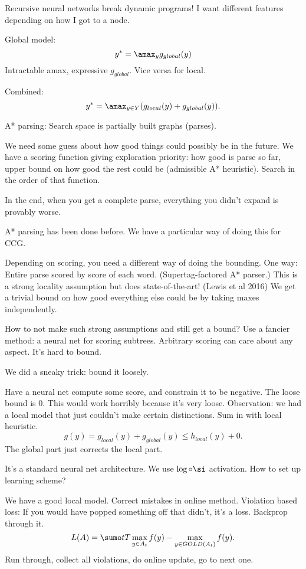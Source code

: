 Recursive neural networks break dynamic programs!
I want different features depending on how I got to a node.

Global model:
$$
y^*=\amax_y g_{global}(y)
$$
Intractable amax, expressive $g_{global}$. Vice versa for local.

Combined:
$$
y^*=\amax_{y\in Y} (g_{local}(y) + g_{global}(y)).
$$

A* parsing: %
Search space is partially built graphs (parses). 

We need some guess about how good things could possibly be in the future. We have a scoring function giving exploration priority: how good is parse so far, upper bound on how good the rest could be (admissible A* heuristic). Search in the order of that function.

In the end, when you get a complete parse, everything you didn't expand is provably worse.

A* parsing has been done before. We have a particular way of doing this for CCG. 

Depending on scoring, you need a different way of doing the bounding. One way: Entire parse scored by score of each word. (Supertag-factored A* parser.) This is a strong locality assumption but does state-of-the-art! (Lewis et al 2016) We get a trivial bound on how good everything else could be by taking maxes independently.

How to not make  such strong assumptions and still get a bound?
Use a fancier method: a neural net for scoring subtrees. Arbitrary scoring can care about any aspect. It's hard to bound.

We did a sneaky trick: bound it loosely.

Have a neural net compute some score, and constrain it to be negative. The loose bound is 0. This would work horribly because it's very loose. Observation: we had a local model that just couldn't make certain distinctions. Sum in with local heuristic.
$$g(y) = g_{local}(y) + g_{global}(y)\le h_{local}(y)+0.$$
The global part just corrects the local part.

It's a standard neural net architecture.
We use $\log \circ \si$ activation.
How to set up learning scheme?

We have a good local model. Correct mistakes in online method. Violation based loss: If you would have popped something off that didn't, it's a loss. Backprop through it. 
$$L(A) = \sumo tT \max_{y\in A_t} f(y) -\max_{y\in GOLD(A_t)}f(y).$$
Run through, collect all violations, do online update, go to next one.

